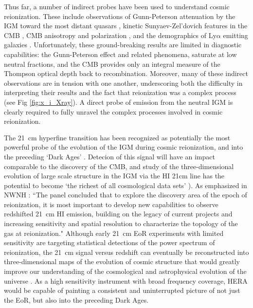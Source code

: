 \documentclass[preprint]{aastex}
\begin{document}
Thus far, a number of indirect probes have been used to understand cosmic
reionization.  These include observations of Gunn-Peterson attenuation by the
IGM toward the most distant quasars \citep{fan_et_al2006,bouwens_et_al2010},
kinetic Sunyaev-Zel'dovich features in the CMB \citep{zahn_et_al2012}, CMB
anisotropy and polarization \citep{page_et_al2007,planck_et_al2013}, and the
demographics of Ly$\alpha$ emitting galaxies
\citep{http://adsabs.harvard.edu/abs/2013arXiv1308.5985T}.  Unfortunately,
these ground-breaking results are limited in diagnostic capabilities: the
Gunn-Peterson effect and related phenomena, saturate at low neutral fractions,
and the CMB provides only an integral measure of the Thompson optical depth
back to recombination.  Moreover, many of these indirect observations are in
tension with one another, underscoring both the difficulty in interpreting
their results and the fact that reionization was a complex process (see Fig \ref{fig:x_i_Xray}).
A direct probe of emission from the neutral IGM is clearly required to fully
unravel the complex processes involved in cosmic reionization. 

The 21~cm hyperfine transition has been recognized as potentially the most
powerful probe of the evolution of the IGM during cosmic reionization, and into
the preceding `Dark Ages' \citep{morales_wyithe2010,furlanetto_et_al2006}.
Detecion of this signal will have an impact
comparable to the discovery of the CMB, and study of the three-dimensional
evolution of large scale structure in the IGM via the HI 21cm line has the
potential to become `the richest of all cosmological data sets'
\citep{barkana_loeb2005a,loeb_zaldarriaga2004}).  As emphasized in
NWNH \citep{astro2010}: ``The panel concluded that to explore the discovery
area of the epoch of reionization, it is most important to develop new
capabilities to observe redshifted 21~cm HI emission, building on the legacy of
current projects and increasing sensitivity and spatial resolution to
characterize the topology of the gas at reionization."  Although early 21~cm
EoR experiments with limited sensitivity are targeting statistical detections
of the power spectrum of reionization, the 21~cm signal versus redshift can
eventually be reconstructed into three-dimensional maps of the evolution of
cosmic structure that would greatly improve our understanding of the
cosmological and astrophysical evolution of the universe
\citep{furlanetto_et_al2006,mao_et_al2008,morales_wyithe2010}. As a high
sensitivity instrument with broad frequency coverage, HERA would be capable of
painting a consistent and uninterrupted picture of not just the EoR, but also
into the preceding Dark Ages.  
\end{document}
